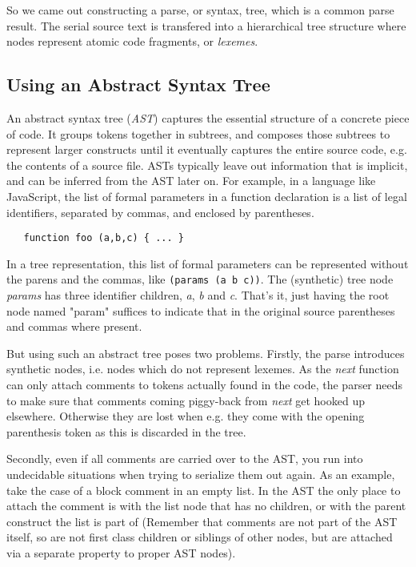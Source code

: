 \documentclass[11pt,a4paper]{article}
\begin{document}
So we came out constructing a parse, or syntax, tree, which is a common parse
result. The serial source text is transfered into a hierarchical tree structure
where nodes represent atomic code fragments, or \emph{lexemes}.


\subsection{Using an Abstract Syntax Tree}

An abstract syntax tree (\emph{AST}) captures the essential structure of a
concrete piece of code. It groups tokens together in subtrees, and composes
those subtrees to represent larger constructs until it eventually captures the
entire source code, e.g. the contents of a source file. ASTs typically leave out
information that is implicit, and can be inferred from the AST later on. For
example, in a language like JavaScript, the list of formal parameters in a
function declaration is a list of legal identifiers, separated by commas, and
enclosed by parentheses.

\begin{verbatim}
   function foo (a,b,c) { ... }
\end{verbatim}

In a tree representation, this list of formal parameters can be represented
without the parens and the commas, like \texttt{(params (a b c))}. The
(synthetic) tree node \emph{params} has three identifier children, \emph{a},
\emph{b} and \emph{c}. That's it, just having the root node named "param"
suffices to indicate that in the original source parentheses and commas where
present.

But using such an abstract tree poses two problems. Firstly, the parse
introduces synthetic nodes, i.e. nodes which do not represent lexemes. As the
\emph{next} function can only attach comments to tokens actually found in the
code, the parser needs to make sure that comments coming piggy-back from
\emph{next} get hooked up elsewhere. Otherwise they are lost when e.g. they come
with the opening parenthesis token as this is discarded in the tree.

Secondly, even if all comments are carried over to the AST, you run into
undecidable situations when trying to serialize them out again. As an example,
take the case of a block comment in an empty list. In the AST the only place to
attach the comment is with the list node that has no children, or with the
parent construct the list is part of (Remember that
comments are not part of the AST itself, so are not first class children or
siblings of
other nodes,  but are attached via a separate property to proper AST nodes).
\end{document}
